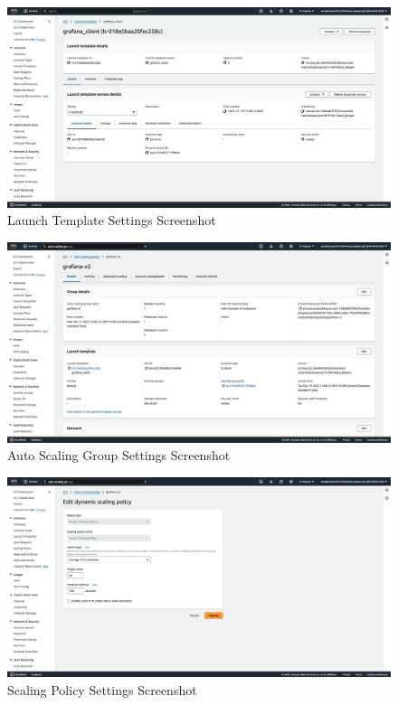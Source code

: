 \documentclass[12pt,oneside]{book} %
\begin{document}
\begin{figure}[H]
    \centering
    \includegraphics[width=1\linewidth]{images/launch-template.png}
    \caption{Launch Template Settings Screenshot}
\end{figure}

\begin{figure}[H]
    \centering
    \includegraphics[width=1\linewidth]{images/auto-scaling-group.png}
    \caption{Auto Scaling Group Settings Screenshot}
\end{figure}

\begin{figure}[H]
    \centering
    \includegraphics[width=1\linewidth]{images/scaling-policy.png}
    \caption{Scaling Policy Settings Screenshot}
\end{figure}
\end{document}
